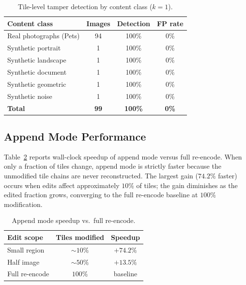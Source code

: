 \documentclass[conference]{IEEEtran}
\begin{document}
\begin{table}[t]
  \centering
  \caption{Tile-level tamper detection by content class ($k{=}1$).}
  \label{tab:detection}
  \begin{tabular}{lccc}
    \toprule
    Content class & Images & Detection & FP rate \\
    \midrule
    Real photographs (Pets) & 94 & 100\% & 0\% \\
    Synthetic portrait      &  1 & 100\% & 0\% \\
    Synthetic landscape     &  1 & 100\% & 0\% \\
    Synthetic document      &  1 & 100\% & 0\% \\
    Synthetic geometric     &  1 & 100\% & 0\% \\
    Synthetic noise         &  1 & 100\% & 0\% \\
    \midrule
    \textbf{Total}          & \textbf{99} & \textbf{100\%} & \textbf{0\%} \\
    \bottomrule
  \end{tabular}
\end{table}

\subsection{Append Mode Performance}

Table~\ref{tab:append} reports wall-clock speedup of append mode versus
full re-encode. When only a fraction of tiles change, append mode is
strictly faster because the unmodified tile chains are never
reconstructed. The largest gain ($74.2\%$ faster) occurs when edits
affect approximately $10\%$ of tiles; the gain diminishes as the
edited fraction grows, converging to the full re-encode baseline at
$100\%$ modification.

\begin{table}[t]
  \centering
  \caption{Append mode speedup vs.\ full re-encode.}
  \label{tab:append}
  \begin{tabular}{lcc}
    \toprule
    Edit scope & Tiles modified & Speedup \\
    \midrule
    Small region  & ${\sim}10\%$ & $+74.2\%$ \\
    Half image    & ${\sim}50\%$ & $+13.5\%$ \\
    Full re-encode & $100\%$     & baseline \\
    \bottomrule
  \end{tabular}
\end{table}
\end{document}

